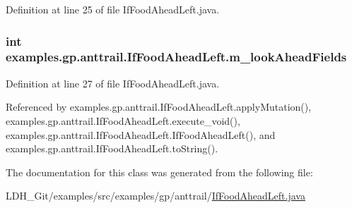 Definition at line 25 of file If\-Food\-Ahead\-Left.\-java.

\hypertarget{classexamples_1_1gp_1_1anttrail_1_1_if_food_ahead_left_a07efe82b3075e75d1141e4f8971fd45a}{
\subsubsection[{m\-\_\-look\-Ahead\-Fields}]{\setlength{\rightskip}{0pt plus 5cm}int examples.\-gp.\-anttrail.\-If\-Food\-Ahead\-Left.\-m\-\_\-look\-Ahead\-Fields\hspace{0.3cm}{\ttfamily [private]}}}\label{classexamples_1_1gp_1_1anttrail_1_1_if_food_ahead_left_a07efe82b3075e75d1141e4f8971fd45a}


Definition at line 27 of file If\-Food\-Ahead\-Left.\-java.



Referenced by examples.\-gp.\-anttrail.\-If\-Food\-Ahead\-Left.\-apply\-Mutation(), examples.\-gp.\-anttrail.\-If\-Food\-Ahead\-Left.\-execute\-\_\-void(), examples.\-gp.\-anttrail.\-If\-Food\-Ahead\-Left.\-If\-Food\-Ahead\-Left(), and examples.\-gp.\-anttrail.\-If\-Food\-Ahead\-Left.\-to\-String().



The documentation for this class was generated from the following file\-:\begin{DoxyCompactItemize}
\item 
L\-D\-H\-\_\-\-Git/examples/src/examples/gp/anttrail/\hyperlink{_if_food_ahead_left_8java}{If\-Food\-Ahead\-Left.\-java}\end{DoxyCompactItemize}
